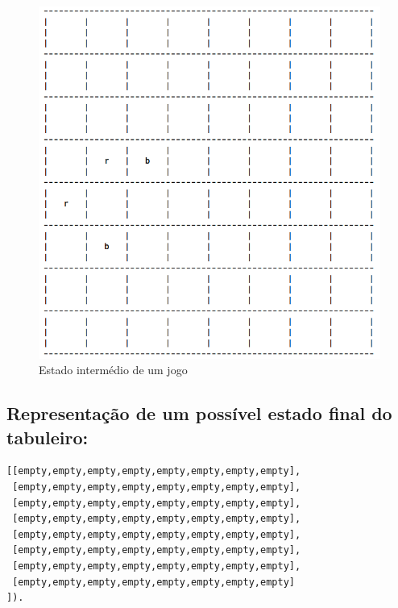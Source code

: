 \documentclass[a4paper,11pt,titlepage]{article}
\begin{document}
\begin{figure}[H]
    \center
    \includegraphics[scale=0.45]{res/8-intermediate-state.png}
    \caption{Estado intermédio de um jogo}
    \label{fig:8-intermediate-state.png}
\end{figure}

\subsection{Representação de um possível estado final do tabuleiro:}
\begin{verbatim}
[[empty,empty,empty,empty,empty,empty,empty,empty],
 [empty,empty,empty,empty,empty,empty,empty,empty],
 [empty,empty,empty,empty,empty,empty,empty,empty],
 [empty,empty,empty,empty,empty,empty,empty,empty],
 [empty,empty,empty,empty,empty,empty,empty,empty],
 [empty,empty,empty,empty,empty,empty,empty,empty],
 [empty,empty,empty,empty,empty,empty,empty,empty],
 [empty,empty,empty,empty,empty,empty,empty,empty]
]).
\end{verbatim}
\end{document}
